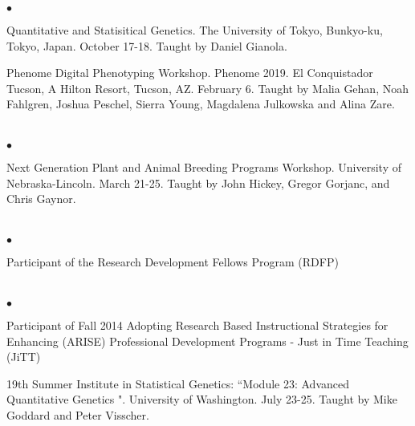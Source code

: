 \documentclass[margin,line,10pt]{res}
\newenvironment{list2}{
  \begin{list}{$\bullet$}{%
      \setlength{\itemsep}{0in}
      \setlength{\parsep}{0in} \setlength{\parskip}{0in}
      \setlength{\topsep}{0in} \setlength{\partopsep}{0in} 
      \setlength{\leftmargin}{0.2in}}}{\end{list}}
\begin{document}
\begin{resume}
\begin{list2}
\item Quantitative and Statisitical Genetics. The University of Tokyo, Bunkyo-ku, Tokyo, Japan. October 17-18. Taught by Daniel Gianola.

  \vspace{0.5cm}
  
\item Phenome Digital Phenotyping Workshop. Phenome 2019. El Conquistador Tucson, A Hilton Resort, Tucson, AZ. February 6. Taught by Malia Gehan, Noah Fahlgren, Joshua Peschel, Sierra Young, Magdalena Julkowska and Alina Zare.
\end{list2}  


\section{}
\begin{list2}
\item Next Generation Plant and Animal Breeding Programs Workshop. University of Nebraska-Lincoln. March 21-25.  Taught by John Hickey, Gregor Gorjanc, and Chris Gaynor.
\end{list2}  


\section{}
\begin{list2}
\item Participant of the Research Development Fellows Program (RDFP) 
\end{list2}

\section{}
\begin{list2}

\item Participant of Fall 2014 Adopting Research Based Instructional Strategies for Enhancing (ARISE) Professional Development Programs - Just in Time Teaching (JiTT)

\vspace{0.5cm}

\item 19th Summer Institute in Statistical Genetics: 
``Module 23: Advanced Quantitative Genetics ". University of Washington.  July 23-25.
Taught by Mike Goddard and Peter Visscher. 

\vspace{0.5cm}


\end{list2}
\end{resume}
\end{document}

